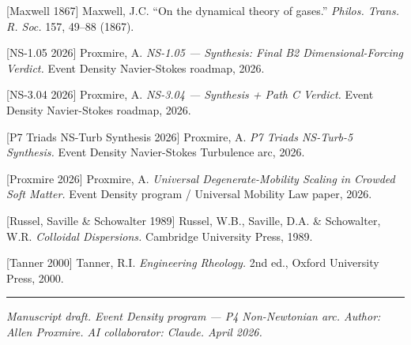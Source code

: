 \documentclass[
  11pt,a4paper]{article}
\begin{document}
{[}Maxwell 1867{]} Maxwell, J.C. ``On the dynamical theory of gases.''
\emph{Philos. Trans. R. Soc.} 157, 49--88 (1867).

{[}NS-1.05 2026{]} Proxmire, A. \emph{NS-1.05 --- Synthesis: Final B2
Dimensional-Forcing Verdict.} Event Density Navier-Stokes roadmap, 2026.

{[}NS-3.04 2026{]} Proxmire, A. \emph{NS-3.04 --- Synthesis + Path C
Verdict.} Event Density Navier-Stokes roadmap, 2026.

{[}P7 Triads NS-Turb Synthesis 2026{]} Proxmire, A. \emph{P7 Triads
NS-Turb-5 Synthesis.} Event Density Navier-Stokes Turbulence arc, 2026.

{[}Proxmire 2026{]} Proxmire, A. \emph{Universal Degenerate-Mobility
Scaling in Crowded Soft Matter.} Event Density program / Universal
Mobility Law paper, 2026.

{[}Russel, Saville \& Schowalter 1989{]} Russel, W.B., Saville, D.A. \&
Schowalter, W.R. \emph{Colloidal Dispersions.} Cambridge University
Press, 1989.

{[}Tanner 2000{]} Tanner, R.I. \emph{Engineering Rheology.} 2nd ed.,
Oxford University Press, 2000.

\begin{center}\rule{0.5\linewidth}{0.5pt}\end{center}

\emph{Manuscript draft. Event Density program --- P4 Non-Newtonian arc.
Author: Allen Proxmire. AI collaborator: Claude. April 2026.}
\end{document}

